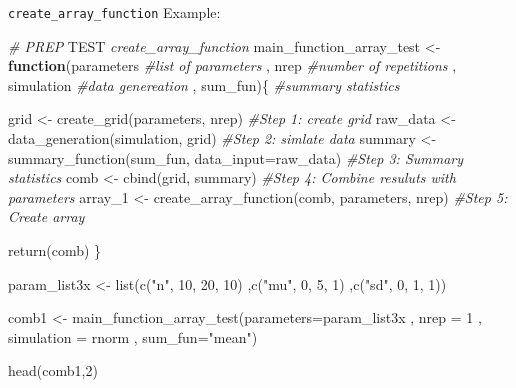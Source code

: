 \documentclass[11pt,a4paper]{article}
\newenvironment{Shaded}{\begin{snugshade}}{\end{snugshade}}
\newcommand{\AlertTok}[1]{\textcolor[rgb]{0.94,0.16,0.16}{#1}}
\newcommand{\AttributeTok}[1]{\textcolor[rgb]{0.77,0.63,0.00}{#1}}
\newcommand{\CommentTok}[1]{\textcolor[rgb]{0.56,0.35,0.01}{\textit{#1}}}
\newcommand{\ControlFlowTok}[1]{\textcolor[rgb]{0.13,0.29,0.53}{\textbf{#1}}}
\newcommand{\DecValTok}[1]{\textcolor[rgb]{0.00,0.00,0.81}{#1}}
\newcommand{\FunctionTok}[1]{\textcolor[rgb]{0.00,0.00,0.00}{#1}}
\newcommand{\NormalTok}[1]{#1}
\newcommand{\OtherTok}[1]{\textcolor[rgb]{0.56,0.35,0.01}{#1}}
\newcommand{\StringTok}[1]{\textcolor[rgb]{0.31,0.60,0.02}{#1}}
\begin{document}
\texttt{create\_array\_function} Example:

\begin{Shaded}
\begin{Highlighting}[]
\CommentTok{\# PREP }\AlertTok{TEST}\CommentTok{ \textasciigrave{}create\_array\_function\textasciigrave{}}
\NormalTok{main\_function\_array\_test }\OtherTok{\textless{}{-}}  \ControlFlowTok{function}\NormalTok{(parameters }\CommentTok{\#list of parameters}
\NormalTok{                                      , nrep }\CommentTok{\#number of repetitions}
\NormalTok{                                      , simulation }\CommentTok{\#data genereation}
\NormalTok{                                      , sum\_fun)\{ }\CommentTok{\#summary statistics}
  
\NormalTok{  grid }\OtherTok{\textless{}{-}} \FunctionTok{create\_grid}\NormalTok{(parameters, nrep) }\CommentTok{\#Step 1: create grid}
\NormalTok{  raw\_data }\OtherTok{\textless{}{-}} \FunctionTok{data\_generation}\NormalTok{(simulation, grid) }\CommentTok{\#Step 2: simlate data}
\NormalTok{  summary }\OtherTok{\textless{}{-}} \FunctionTok{summary\_function}\NormalTok{(sum\_fun, }\AttributeTok{data\_input=}\NormalTok{raw\_data) }\CommentTok{\#Step 3: Summary statistics}
\NormalTok{  comb }\OtherTok{\textless{}{-}} \FunctionTok{cbind}\NormalTok{(grid, summary) }\CommentTok{\#Step 4: Combine resuluts with parameters}
\NormalTok{  array\_1 }\OtherTok{\textless{}{-}} \FunctionTok{create\_array\_function}\NormalTok{(comb, parameters, nrep) }\CommentTok{\#Step 5: Create array}
  
  \FunctionTok{return}\NormalTok{(comb)}
\NormalTok{\}}

\NormalTok{param\_list3x }\OtherTok{\textless{}{-}} \FunctionTok{list}\NormalTok{(}\FunctionTok{c}\NormalTok{(}\StringTok{"n"}\NormalTok{, }\DecValTok{10}\NormalTok{, }\DecValTok{20}\NormalTok{, }\DecValTok{10}\NormalTok{)}
\NormalTok{                     ,}\FunctionTok{c}\NormalTok{(}\StringTok{"mu"}\NormalTok{, }\DecValTok{0}\NormalTok{, }\DecValTok{5}\NormalTok{, }\DecValTok{1}\NormalTok{)}
\NormalTok{                     ,}\FunctionTok{c}\NormalTok{(}\StringTok{"sd"}\NormalTok{, }\DecValTok{0}\NormalTok{, }\DecValTok{1}\NormalTok{, }\DecValTok{1}\NormalTok{))}

\NormalTok{comb1 }\OtherTok{\textless{}{-}} \FunctionTok{main\_function\_array\_test}\NormalTok{(}\AttributeTok{parameters=}\NormalTok{param\_list3x}
\NormalTok{                                  , }\AttributeTok{nrep =} \DecValTok{1}
\NormalTok{                                  , }\AttributeTok{simulation =}\NormalTok{ rnorm}
\NormalTok{                                  , }\AttributeTok{sum\_fun=}\StringTok{"mean"}\NormalTok{)}

\FunctionTok{head}\NormalTok{(comb1,}\DecValTok{2}\NormalTok{)}
\end{Highlighting}
\end{Shaded}
\end{document}

